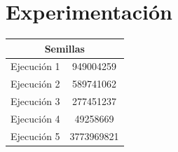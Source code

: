 \section{Experimentación}




\vspace*{\fill}

\begin{center}
    \begin{tabular}{|| c | c ||} 
        \hline
        \multicolumn{2}{|c|}{\textbf{Semillas}} \\
        \hline
        Ejecución 1 & 949004259 \\
        \hline
        Ejecución 2 & 589741062 \\
        \hline
        Ejecución 3 & 277451237 \\
        \hline
        Ejecución 4 & 49258669 \\
        \hline
        Ejecución 5 & 3773969821 \\
        \hline
    \end{tabular}
\end{center}


